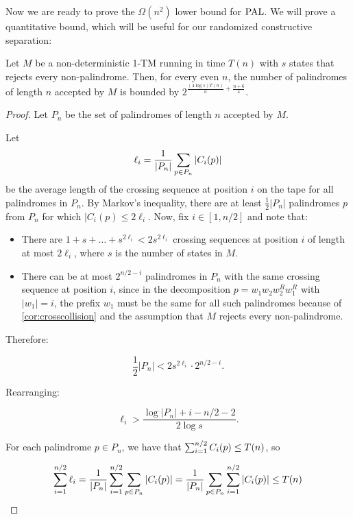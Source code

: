 Now we are ready to prove the $\Omega(n^2)$ lower bound for $\mathrm{PAL}$. We will prove a quantitative
bound, which will be useful for our randomized constructive separation:

\begin{theorem}
\label{thm:palindromebound}
Let $M$ be a non-deterministic 1-TM running in time $T(n)$ with $s$ states
that rejects every non-palindrome.
Then, for every even $n$, the number of palindromes of length $n$ accepted by $M$ is
bounded by $2^{\frac{(4 \log s) T(n)}{n} + \frac{n+6}{4}}$.
\end{theorem}
\begin{proof}
Let $P_n$ be the set of palindromes of length $n$ accepted by $M$. 

Let $$\ell_i = \frac{1}{|P_n|} \sum_{p \in P_n} |C_i(p)|$$ be the average length of the
crossing sequence at position $i$ on the tape for all palindromes in $P_n$.
By Markov's inequality, there are at least $\frac{1}{2}|P_n|$ palindromes $p$
from $P_n$ for which $|C_i(p) \leq 2\ell_i$.
Now, fix $i \in [1, n/2]$ and note that:

\begin{itemize}
    \item There are $1 + s + \dots + s^{2\ell_i} < 2s^{2\ell_i}$ crossing sequences
    at position $i$
    of length at most $2\ell_i$, where $s$ is the number of states in $M$.
    \item There can be at most $2^{n/2-i}$ palindromes in $P_n$ with the same crossing sequence
    at position $i$,
    since in the decomposition $p = w_1 w_2 w_2^R w_1^R$ with $|w_1| = i$,
    the prefix
    $w_1$ must be the same for all such palindromes because of \cref{cor:crosscollision}
    and the assumption that $M$ rejects every non-palindrome. 
\end{itemize}

Therefore:

$$
\frac{1}{2}|P_n| < 2 s^{2\ell_i} \cdot 2^{n/2-i}.
$$

Rearranging: 

\begin{equation}
\ell_i > \frac{\log |P_n| + i - n/2 - 2}{2 \log s}.
\label{previneqpal}
\end{equation}

For each palindrome $p \in P_n$, we have that $\sum_{i=1}^{n/2} C_i(p) \leq T(n)$, so

$$
\sum_{i=1}^{n/2} \ell_i = \frac{1}{|P_n|} \sum_{i=1}^{n/2} \sum_{p \in P_n} |C_i(p)| = \frac{1}{|P_n|} \sum_{p \in P_n} \sum_{i=1}^{n/2} |C_i(p)|  \leq T(n)
$$


\end{proof}
